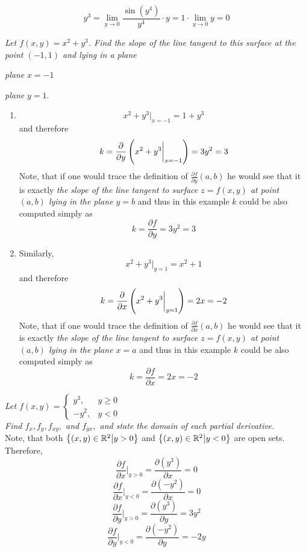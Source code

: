 \documentclass[8pt]{article} %
\begin{document}
\begin{description}
{\[		{y^3}=\lim_{y\to0}\frac{\sin(y^4)}{y^4}\cdot y=1\cdot\lim_{y\to 0}y=0\]
		}
	\item[\# 62.]{{\it Let $f(x,y)=x^2+y^3$. Find the slope of the line tangent to this surface at the point $(-1,1)$ and lying in a plane}
		\begin{inparaenum}[\bfseries a.]\item \textit{plane} $x=-1$\quad\item \textit{plane} $y=1$.\end{inparaenum}
		\begin{enumerate}[\bfseries a.]
			\item \[x^2+y^3\bigg|_{x=-1}=1+y^3\]
				and therefore
				\[k=\frac{\partial}{\partial y}\left(x^2+y^3\bigg|_{x=-1}\right)=3y^2=3\]
				Note, that if one would trace the definition of $\frac{
				\partial f}{\partial y}(a,b)$ he would see that it is exactly {\it
				the slope of the line tangent to surface $z=f(x,y)$ at point $(a,b)$ lying in the plane $y=b$} and thus in this
				example $k$ could be also computed simply as
				\[k=\frac{\partial f}{\partial y}=3y^2=3\]
			\item Similarly,
				\[x^2+y^3\bigg|_{y=1}=x^2+1\]
				and therefore
				\[k=\frac{\partial}{\partial x}\left(x^2+y^3\bigg|_{y=1}\right)=2x=-2\]
				Note, that if one would trace the definition of $\frac{\partial f}{\partial x}
				(a,b)$ he would see that it is exactly {\it
				the slope of the line tangent to surface $z=f(x,y)$ at point $(a,b)$ lying in the plane $x=a$} and thus in this
				example $k$ could be also computed simply as
				\[k=\frac{\partial f}{\partial x}=2x=-2\]
		\end{enumerate}
		}
	\item[\# 71.]{{\it Let $f(x,y)=\left\{\begin{array}{ll}y^3,&y\geq 0\\-y^2,&y<0\end{array}\right.$\\Find $f_x,f_y,f_{xy},$ and $f_{yx},$ and
			state the domain of each partial derivative.}\\
			Note, that both $\left\{(x,y)\in\mathbb{R}^2\big| y>0\right\}$ and $\left\{(x,y)\in\mathbb{R}^2\big| y<0\right\}$ are open sets.
			Therefore, 
			\[\frac{\partial f}{\partial x}\bigg|_{y>0}=\frac{\partial (y^3)}{\partial x}=0\]
			\[\frac{\partial f}{\partial x}\bigg|_{y<0}=\frac{\partial (-y^2)}{\partial x}=0\]
			\[\frac{\partial f}{\partial y}\bigg|_{y>0}=\frac{\partial (y^3)}{\partial y}=3y^2\]
			\[\frac{\partial f}{\partial y}\bigg|_{y<0}=\frac{\partial (-y^2)}{\partial y}=-2y\]
}
\end{description}
\end{document}
